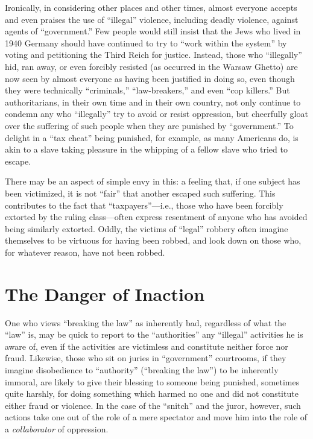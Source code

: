 \documentclass{book}
\begin{document}
Ironically, in considering other places and other times, almost everyone accepts and even praises the use of \enquote{illegal} violence, including deadly violence, against agents of \enquote{government.} Few people would still insist that the Jews who lived in 1940 Germany should have continued to try to \enquote{work within the system} by voting and petitioning the Third Reich for justice. Instead, those who \enquote{illegally} hid, ran away, or even forcibly resisted (as occurred in the Warsaw Ghetto) are now seen by almost everyone as having been justified in doing so, even though they were technically \enquote{criminals,} \enquote{law-breakers,} and even \enquote{cop killers.} But authoritarians, in their own time and in their own country, not only continue to condemn any who \enquote{illegally} try to avoid or resist oppression, but cheerfully gloat over the suffering of such people when they are punished by \enquote{government.} To delight in a \enquote{tax cheat} being punished, for example, as many Americans do, is akin to a slave taking pleasure in the whipping of a fellow slave who tried to escape.

There may be an aspect of simple envy in this: a feeling that, if one subject has been victimized, it is not \enquote{fair} that another escaped such suffering. This contributes to the fact that \enquote{taxpayers}---i.e., those who have been forcibly extorted by the ruling class---often express resentment of anyone who has avoided being similarly extorted. Oddly, the victims of \enquote{legal} robbery often imagine themselves to be virtuous for having been robbed, and look down on those who, for whatever reason, have not been robbed.

\section{The Danger of Inaction}

One who views \enquote{breaking the law} as inherently bad, regardless of what the \enquote{law} is, may be quick to report to the \enquote{authorities} any \enquote{illegal} activities he is aware of, even if the activities are victimless and constitute neither force nor fraud. Likewise, those who sit on juries in \enquote{government} courtrooms, if they imagine disobedience to \enquote{authority} (\enquote{breaking the law}) to be inherently immoral, are likely to give their blessing to someone being punished, sometimes quite harshly, for doing something which harmed no one and did not constitute either fraud or violence. In the case of the \enquote{snitch} and the juror, however, such actions take one out of the role of a mere spectator and move him into the role of a \emph{collaborator} of oppression.
\end{document}
